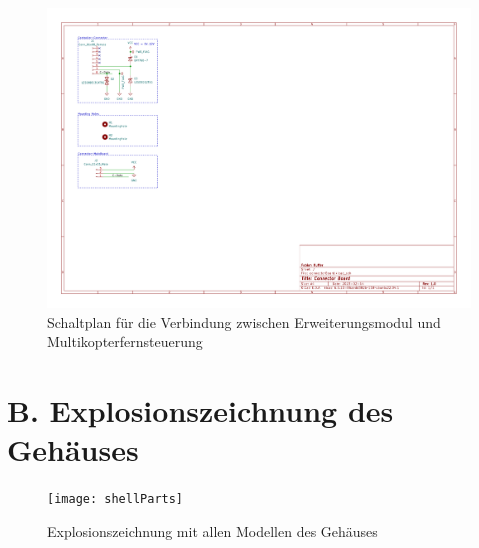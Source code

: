 \begin{figure}[H]
    \centering
    \includegraphics[width=0.9\textheight,angle=90]{../PDFs/connectorBoard.pdf}
    \caption{Schaltplan für die Verbindung zwischen Erweiterungsmodul und Multikopterfernsteuerung}
    \label{fig:connectorPCB}
\end{figure}

\section*{B. Explosionszeichnung des Gehäuses}
\begin{figure}[H]
    \centering
    \texttt{[image: shellParts]}
    \caption{Explosionszeichnung mit allen Modellen des Gehäuses}
    \label{fig:shellPartsExplosion}
\end{figure}